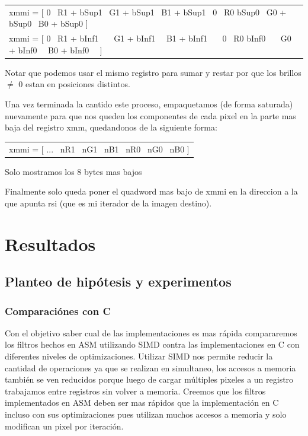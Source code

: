 \documentclass[a4paper]{article}
\begin{document}
\begin{center}
	\begin{tabular}{l}
		xmmi = [ 0 \textpipe\ R1 + bSup1 \textpipe\ G1 + bSup1 \textpipe\ B1 + bSup1 \textpipe\ 0 \textpipe\ R0 bSup0 \textpipe\ G0 + bSup0 \textpipe\ B0 + bSup0 ] \\
		
		xmmi = [ 0 \textpipe\ R1 + bInf1 \ \  \textpipe\ G1 + bInf1 \ \textpipe\ B1 + bInf1 \ \ \textpipe\ 0 \textpipe\ R0 bInf0 \ \ \textpipe\ G0 + bInf0 \ \textpipe\ B0 + bInf0 \ \ ]
		 
	\end{tabular}
\end{center}

Notar que podemos usar el mismo registro para sumar y restar por que los brillos $\neq$ 0 estan en posiciones distintos.

Una vez terminada la cantido este proceso, empaquetamos (de forma saturada) nuevamente para que nos queden los componentes de cada pixel en la parte mas baja del registro xmm, quedandonos de la siguiente forma:

\begin{center}
	\begin{tabular}{l}
		xmmi = [ ... \textpipe\ nR1 \textpipe\ nG1 \textpipe\ nB1 \textpipe\ nR0 \textpipe\ nG0 \textpipe\ nB0 ]
	\end{tabular}
	
	Solo mostramos los 8 bytes mas bajos
\end{center}


Finalmente solo queda poner el quadword mas bajo de xmmi en la direccion a la que apunta rsi (que es mi iterador de la imagen destino).

\section{Resultados}
\subsection{Planteo de hipótesis y experimentos}

\subsubsection{Comparaci\'ones con C}

Con el objetivo saber cual de las implementaciones es mas r\'apida compararemos los filtros hechos en ASM utilizando SIMD contra las implementaciones en C con diferentes niveles de optimizaciones. Utilizar SIMD nos permite reducir la cantidad de operaciones ya que se realizan en simultaneo, los accesos a memoria también se ven reducidos porque luego de cargar múltiples pixeles a un registro trabajamos entre registros sin volver a memoria. Creemos que los filtros implementados en ASM deben ser mas r\'apidos que la implementaci\'on en C incluso con sus optimizaciones pues utilizan muchos accesos a memoria y solo modifican un pixel por iteraci\'on.
\end{document}
